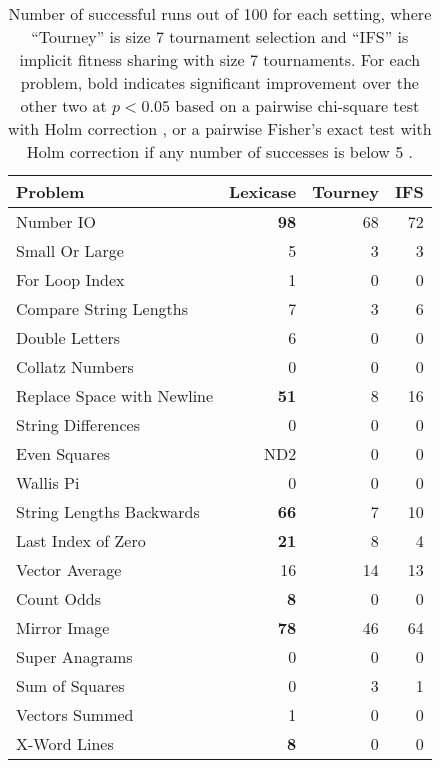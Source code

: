 \documentclass{sig-alternate}
\begin{document}
\begin{table}[t]
\centering
\caption{Number of successful runs out of 100 for each setting, where ``Tourney'' is size 7 tournament selection and ``IFS'' is implicit fitness sharing with size 7 tournaments. For each problem, bold indicates significant improvement over the other two at $p < 0.05$ based on a pairwise chi-square test with Holm correction \cite{R}, or a pairwise Fisher's exact test with Holm correction if any number of successes is below 5 \cite{fmsb}.}
\label{tableResults}
\begin{tabular}{|l|rrr|}
\hline
Problem                    & Lexicase & Tourney & IFS \\
\hline
Number IO                  & \textbf{98}       & 68      & 72  \\
Small Or Large             & 5        & 3       & 3   \\
For Loop Index             & 1        & 0       & 0   \\
Compare String Lengths     & 7        & 3       & 6   \\
Double Letters             & 6        & 0       & 0   \\ 
Collatz Numbers            & 0        & 0       & 0   \\
Replace Space with Newline & \textbf{51}       & 8       & 16  \\
String Differences         & 0        & 0       & 0   \\
Even Squares               & ND2      & 0       & 0   \\
Wallis Pi                  & 0        & 0       & 0   \\
String Lengths Backwards   & \textbf{66}       & 7       & 10  \\
Last Index of Zero         & \textbf{21}       & 8       & 4   \\
Vector Average             & 16       & 14      & 13  \\
Count Odds                 & \textbf{8}        & 0       & 0   \\
Mirror Image               & \textbf{78}       & 46      & 64  \\
Super Anagrams             & 0        & 0       & 0   \\
Sum of Squares             & 0        & 3       & 1   \\
Vectors Summed             & 1        & 0       & 0   \\
X-Word Lines               & \textbf{8}        & 0       & 0   \\

\end{tabular}
\end{table}
\end{document}
